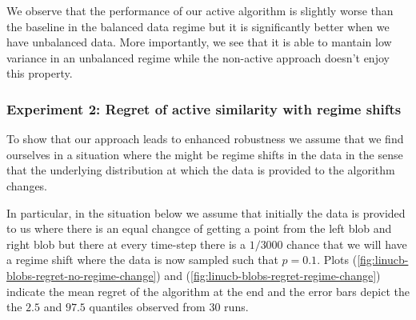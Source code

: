 \documentclass{article}
\begin{document}
We observe that the performance of our active algorithm is slightly worse than the baseline in the balanced data regime
but it is significantly better when we have unbalanced data. More importantly, we see that it is able to mantain low variance
in an unbalanced regime while the non-active approach doesn't enjoy this property.

\subsubsection{Experiment 2: Regret of active similarity with regime shifts}
To show that our approach leads to enhanced robustness we assume that we find ourselves in a situation
where the might be regime shifts in the data in the sense that the underlying distribution at which the data is provided
to the algorithm changes.

In particular, in the situation below we assume that initially the data is provided to us where there is an equal changce of getting a point
from the left blob and right blob but there at every time-step there is a $1/3000$ chance that
we will have a regime shift where the data is now sampled such that $p = 0.1$.
Plots (\ref{fig:linucb-blobs-regret-no-regime-change}) and (\ref{fig:linucb-blobs-regret-regime-change}) indicate the mean regret of the algorithm at the end
and the error bars depict the the $2.5$ and $97.5$ quantiles observed from 30 runs.
\end{document}
